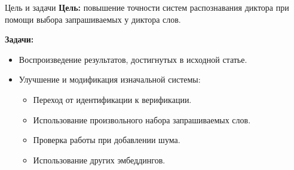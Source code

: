 \documentclass[aspectratio=43]{beamer}
\begin{document}
\begin{frame}{Цель и задачи}
    \textbf{Цель:} повышение точности систем распознавания диктора при помощи
    выбора запрашиваемых у диктора слов.\vspace{1em}

    \textbf{Задачи:}
    \begin{itemize}
        \item Воспроизведение результатов, достигнутых в исходной статье.
        \item Улучшение и модификация изначальной системы:
        \begin{itemize}
            \item Переход от идентификации к верификации.
            \item Использование произвольного набора запрашиваемых слов.
            \item Проверка работы при добавлении шума.
            \item Использование других эмбеддингов.
        \end{itemize}
    \end{itemize}
\end{frame}
\end{document}
